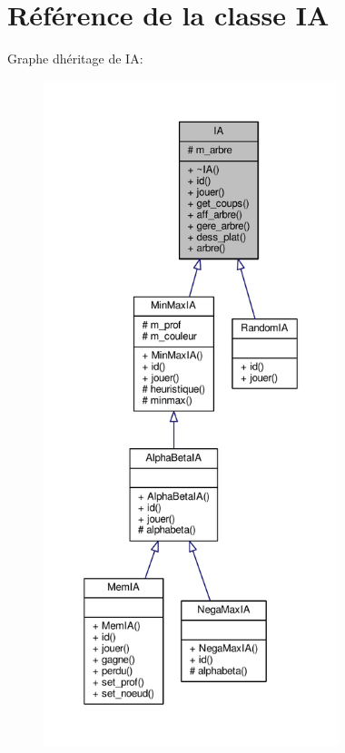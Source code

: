 \hypertarget{classIA}{}\section{Référence de la classe IA}
\label{classIA}


Graphe d\textquotesingle{}héritage de IA\+:\nopagebreak
\begin{figure}[H]
\begin{center}
\leavevmode
\includegraphics[height=550pt]{classIA__inherit__graph}
\end{center}
\end{figure}


